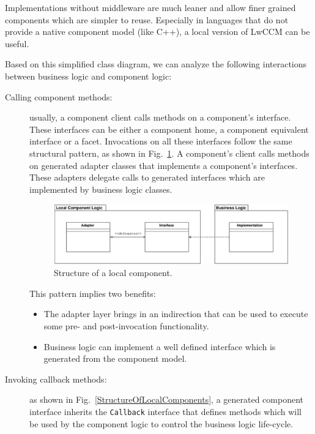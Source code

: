 \noindent
Implementations without middleware are much leaner and allow
finer grained components which are simpler to reuse.
Especially in languages that do not provide a native component model
(like C++), a local version of LwCCM can be useful.  

\newpage
\noindent
Based on this simplified class diagram, we can analyze the following
interactions between business logic and component logic:

\begin{description}
\item [Calling component methods:]
usually, a component client calls methods on a component's interface.
These interfaces can be either a component home, a component equivalent 
interface or a facet.
Invocations on all these interfaces follow the same structural pattern,
as shown in Fig.~\ref{LocalComponentImplementationStructure}.
A component's client calls methods on generated adapter classes 
that implements a component's interfaces. 
These adapters delegate calls 
to generated interfaces which are implemented by business logic classes.
\begin{figure}[htbp]
    \begin{center}
    \includegraphics [width=13cm,angle=0] 
		     {uml/LocalComponentImplementationStructure.eps}
    \caption{Structure of a local component.}
    \label{LocalComponentImplementationStructure}            
    \end{center}
\end{figure}

This pattern implies two benefits:
\begin{itemize}
\item The adapter layer brings in an indirection that can be used to execute
some pre- and post-invocation functionality.  

\item Business logic can implement a well defined interface which is generated 
from the component model.
\end{itemize}

\item [Invoking callback methods:]
as shown in Fig.~\ref{StructureOfLocalComponents}, a generated component 
interface inherits the {\tt Callback} interface that defines methods which 
will be used by the component logic to control the business logic life-cycle.


\end{description}
